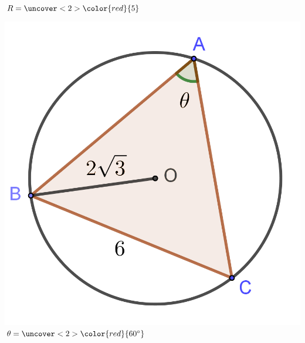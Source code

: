 \documentclass[t,8pt]{beamer}
\newcommand{\red}[1]{\color{red}{#1}}
\begin{document}
\begin{frame}{\subsecname}
\begin{minipage}{.26\textwidth}
\\\(R=\uncover<2>{\red{5}}\)
\end{minipage}
\qquad
\begin{minipage}{.26\textwidth}\centering
\includegraphics[width=\textwidth]{img/3-2_sinlaw_2-3}
\\\(\theta=\uncover<2>{\red{60\degree}}\)
\end{minipage}
\end{frame}
\end{document}
